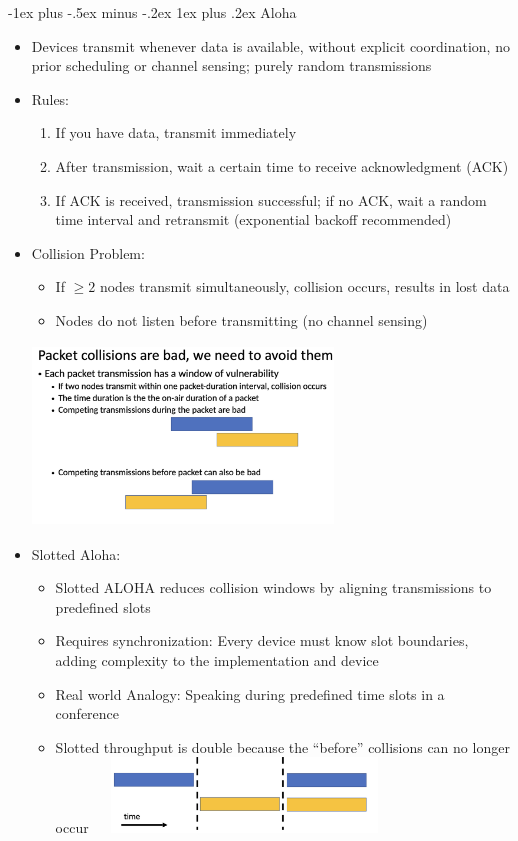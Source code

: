 \documentclass[10pt,landscape]{article}
\makeatletter
\newcommand{\subsubsubsection}{\@startsection{subsubsection}{3}{0mm}%
                                {-1ex plus -.5ex minus -.2ex}%
                                {1ex plus .2ex}%
                                {\normalfont\scriptsize\bfseries}}
\newcommand{\1}{\mathmybb{1}}
\makeatother
\begin{document}
\begin{multicols*}{3}
\subsubsubsection{Aloha}
\begin{itemize}
  \item Devices transmit whenever data is available, without explicit coordination, no prior scheduling or channel sensing; purely random transmissions 
  \item Rules:
  \begin{enumerate}
    \item If you have data, transmit immediately
    \item After transmission, wait a certain time to receive acknowledgment (ACK)
    \item If ACK is received, transmission successful; if no ACK, wait a random time interval and retransmit (exponential backoff recommended) 
  \end{enumerate}
  \item Collision Problem:
  \begin{itemize}
    \item If $\geq 2$ nodes transmit simultaneously, collision occurs, results in lost data
    \item Nodes do not listen before transmitting (no channel sensing)
  \end{itemize}
  \includegraphics*[width=8cm, height=4.8cm]{images/packetcollision1.png}
  \item Slotted Aloha: 
  \begin{itemize}
    \item Slotted ALOHA reduces collision windows by aligning transmissions to predefined slots
    \item Requires synchronization: Every device must know slot boundaries, adding complexity to the implementation and device
    \item Real world Analogy: Speaking during predefined time slots in a conference
    \item Slotted throughput is double because the “before” collisions can no longer occur
    \includegraphics*[width=8cm, height=2cm]{images/packetcollision2.png}
  \end{itemize}
\end{itemize}


\end{multicols*}
\end{document}
